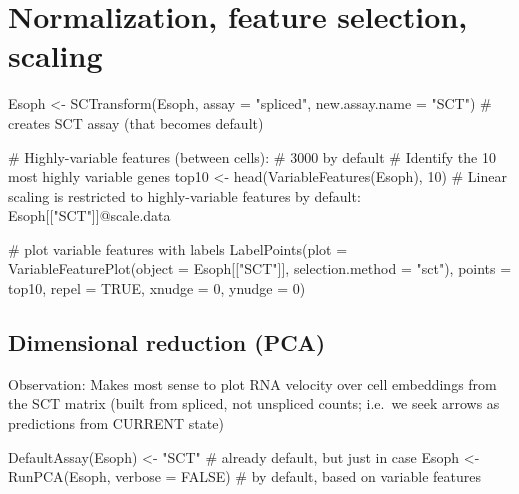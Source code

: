 \documentclass[
  letterpaper,
  DIV=11,
  numbers=noendperiod]{scrreprt}
\newenvironment{Shaded}{\begin{snugshade}}{\end{snugshade}}
\newcommand{\AttributeTok}[1]{\textcolor[rgb]{0.40,0.45,0.13}{#1}}
\newcommand{\CommentTok}[1]{\textcolor[rgb]{0.37,0.37,0.37}{#1}}
\newcommand{\ConstantTok}[1]{\textcolor[rgb]{0.56,0.35,0.01}{#1}}
\newcommand{\DecValTok}[1]{\textcolor[rgb]{0.68,0.00,0.00}{#1}}
\newcommand{\FunctionTok}[1]{\textcolor[rgb]{0.28,0.35,0.67}{#1}}
\newcommand{\NormalTok}[1]{\textcolor[rgb]{0.00,0.23,0.31}{#1}}
\newcommand{\OtherTok}[1]{\textcolor[rgb]{0.00,0.23,0.31}{#1}}
\newcommand{\StringTok}[1]{\textcolor[rgb]{0.13,0.47,0.30}{#1}}
\begin{document}
\section{Normalization, feature selection,
scaling}\label{normalization-feature-selection-scaling}

\begin{Shaded}
\begin{Highlighting}[]
\NormalTok{Esoph }\OtherTok{\textless{}{-}} \FunctionTok{SCTransform}\NormalTok{(Esoph, }\AttributeTok{assay =} \StringTok{"spliced"}\NormalTok{, }\AttributeTok{new.assay.name =} \StringTok{"SCT"}\NormalTok{)}
\CommentTok{\# creates SCT assay (that becomes default)}

\CommentTok{\# Highly{-}variable features (between cells):  \# 3000 by default}
\CommentTok{\# Identify the 10 most highly variable genes}
\NormalTok{top10 }\OtherTok{\textless{}{-}} \FunctionTok{head}\NormalTok{(}\FunctionTok{VariableFeatures}\NormalTok{(Esoph), }\DecValTok{10}\NormalTok{)}
\CommentTok{\# Linear scaling is restricted to highly{-}variable features by default: Esoph[["SCT"]]@scale.data}
\end{Highlighting}
\end{Shaded}

\begin{Shaded}
\begin{Highlighting}[]
\CommentTok{\# plot variable features with labels}
\FunctionTok{LabelPoints}\NormalTok{(}\AttributeTok{plot =} \FunctionTok{VariableFeaturePlot}\NormalTok{(}\AttributeTok{object =}\NormalTok{ Esoph[[}\StringTok{"SCT"}\NormalTok{]], }\AttributeTok{selection.method =} \StringTok{"sct"}\NormalTok{), }\AttributeTok{points =}\NormalTok{ top10, }\AttributeTok{repel =} \ConstantTok{TRUE}\NormalTok{, }\AttributeTok{xnudge =} \DecValTok{0}\NormalTok{, }\AttributeTok{ynudge =} \DecValTok{0}\NormalTok{)}
\end{Highlighting}
\end{Shaded}

\subsection{Dimensional reduction
(PCA)}\label{dimensional-reduction-pca}

Observation: Makes most sense to plot RNA velocity over cell embeddings
from the SCT matrix (built from spliced, not unspliced counts; i.e.~we
seek arrows as predictions from CURRENT state)

\begin{Shaded}
\begin{Highlighting}[]
\FunctionTok{DefaultAssay}\NormalTok{(Esoph) }\OtherTok{\textless{}{-}} \StringTok{"SCT"} \CommentTok{\# already default, but just in case}
\NormalTok{Esoph }\OtherTok{\textless{}{-}} \FunctionTok{RunPCA}\NormalTok{(Esoph, }\AttributeTok{verbose =} \ConstantTok{FALSE}\NormalTok{) }\CommentTok{\# by default, based on variable features}
\end{Highlighting}
\end{Shaded}
\end{document}
